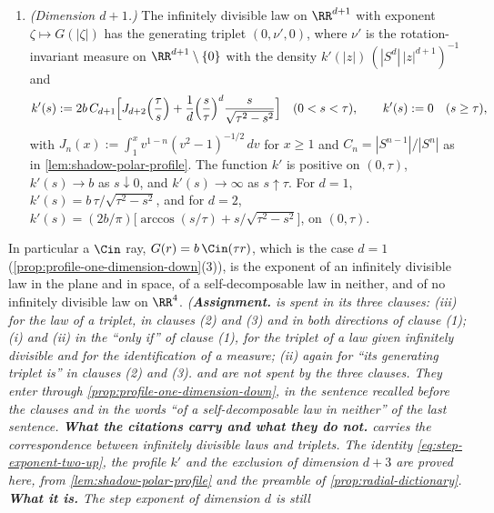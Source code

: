 \begin{proposition}
\begin{enumerate}
rate $b/d$, uniformly distributed on that sphere. Its generating triplet is
$(0,\ \nu^{\mathrm{step}}_{d+2} + \tfrac{b}{d}\,\sigma_\tau,\ 0)$, with $\nu^{\mathrm{step}}_{d+2}$
the \Levy{} measure of that step datum.
\item \emph{(Dimension $d + 1$.)} The infinitely divisible law on $\RR^{d+1}$ with exponent
$\zeta \mapsto G(|\zeta|)$ has the generating triplet $(0, \nu', 0)$, where $\nu'$ is the
rotation-invariant measure on $\RR^{d+1} \setminus \{0\}$ with the density
$k'(|z|)\,(|S^{d}|\,|z|^{d+1})^{-1}$ and
\[
  k'(s) := 2b\,C_{d+1}\Bigl[J_{d+2}\Bigl(\frac{\tau}{s}\Bigr)
     + \frac{1}{d}\Bigl(\frac{s}{\tau}\Bigr)^{d}\frac{s}{\sqrt{\tau^2 - s^2}}\Bigr]
  \quad (0 < s < \tau), \qquad k'(s) := 0 \quad (s \ge \tau) ,
\]
with $J_n(x) := \int_1^x v^{1-n}(v^2-1)^{-1/2}\,dv$ for $x \ge 1$ and $C_n = |S^{n-1}|/|S^{n}|$
as in \ref{lem:shadow-polar-profile}. The function $k'$ is positive on $(0,\tau)$,
$k'(s) \to b$ as $s \downarrow 0$, and $k'(s) \to \infty$ as $s \uparrow \tau$. For $d = 1$,
$k'(s) = b\,\tau/\sqrt{\tau^2 - s^2}$, and for $d = 2$,
$k'(s) = (2b/\pi)\bigl[\arccos(s/\tau) + s/\sqrt{\tau^2 - s^2}\bigr]$, on $(0,\tau)$.
\end{enumerate}
In particular a $\Cin$ ray, $G(r) = b\,\Cin(\tau r)$, which is the case $d = 1$
(\ref{prop:profile-one-dimension-down}(3)), is the exponent of an infinitely divisible law in the
plane and in space, of a self-decomposable law in neither, and of no infinitely divisible law on
$\RR^4$.
\statusA\quad{}\quad{}\quad{}\quad\emph{(\textbf{Assignment.}
 is spent in its three clauses: (iii) for the law of a triplet, in clauses (2) and (3)
and in both directions of clause (1); (i) and (ii) in the ``only if'' of clause (1), for the
triplet of a law given infinitely divisible and for the identification of a \Levy{} measure; (ii)
again for ``its generating triplet is'' in clauses (2) and (3).  and  are
not spent by the three clauses. They enter through \ref{prop:profile-one-dimension-down}, in the
sentence recalled before the clauses and in the words ``of a self-decomposable law in neither''
of the last sentence. \textbf{What the citations carry and what they do not.} 
carries the correspondence between infinitely divisible laws and triplets. The identity
\ref{eq:step-exponent-two-up}, the profile $k'$ and the exclusion of dimension $d + 3$ are
proved here, from \ref{lem:shadow-polar-profile} and the preamble of
\ref{prop:radial-dictionary}. \textbf{What it is.} The step exponent of dimension $d$ is still
}
\end{proposition}
